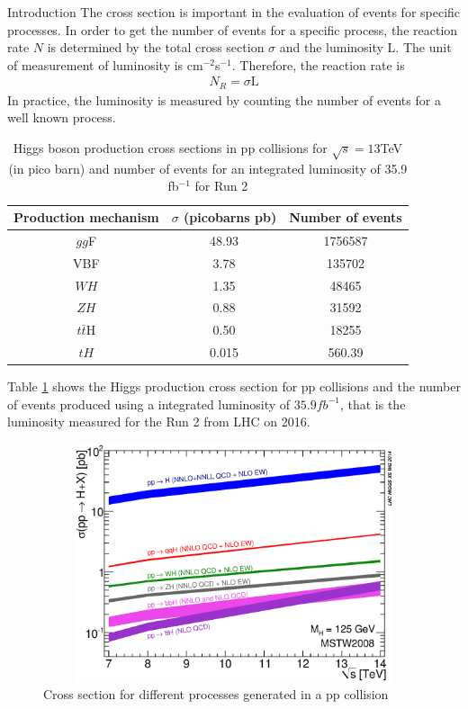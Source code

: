 \begin{chapter}{Introduction}
The cross section is important in the evaluation of events for specific processes. In order to get the number of events for a specific process, the reaction rate $N$ is determined by the total cross section $\sigma$ and the luminosity L.
The unit of measurement of luminosity is cm$^{-2}$s$^{-1}$. Therefore, the reaction rate is 
\begin{align} \label{nr}
N_R=\sigma \text{L}
\end{align}
In practice, the luminosity is measured by counting the number of events for a well known process.
\begin{table}[ht]
\centering
\caption[Higgs boson production cross sections in pp collisions for $\sqrt{s}=13$TeV (in pico barn) and number of events for an integrated luminosity of 35.9 fb$^{-1}$ for Run 2]{	Higgs boson production cross sections in pp collisions for $\sqrt{s}=13$TeV (in pico barn) and number of events for an integrated luminosity of 35.9 fb$^{-1}$ for Run 2 \protect \cite{pd}}
\begin{tabular}{|c|c|c|}
\hline
Production mechanism &
$\sigma$ (picobarns pb) & Number of events \\
\hline
$gg$F & 48.93 & 1756587\\
\hline
VBF & 3.78 & 135702\\
\hline
$WH$ & 1.35 & 48465\\
\hline
$ZH$ &0.88 & 31592\\
\hline
$t\bar{t}$H & 0.50 & 18255\\
\hline
$tH$	& 0.015 & 560.39\\
\hline
\end{tabular}
\label{crt}
\end{table}

 Table \ref{crt} shows the Higgs production cross section for pp collisions and the number of events produced using a integrated luminosity of $35.9 fb^{-1}$, that is the luminosity measured for the Run 2 from LHC on 2016\cite{pd}.

\begin{figure}
\centering
\includegraphics[width=12cm,height=7cm]{Chapter1/7-14xsec.eps}
\caption[Cross section for different processes generated in a pp collision]{
Cross section for different processes generated in a pp collision  \cite{dcrosse}}
 \label{csp}
\end{figure}


\end{chapter}
